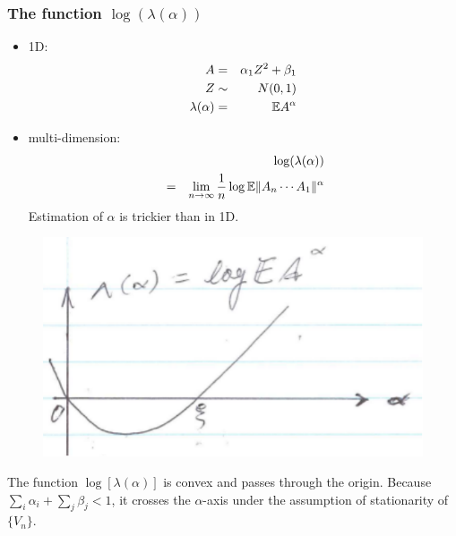 \documentclass{beamer}
\begin{document}
\begin{frame}
  \frametitle{The function $\log(\lambda(\alpha))$}
  \begin{minipage}{0.5\linewidth}
    \begin{small}
      \begin{itemize}
      \item 1D:
        \begin{eqnarray*}
          A &=& \alpha_1 Z^2 + \beta_1 \\
          Z &\sim& N(0,1) \\
          \lambda(\alpha) &=& \mathbb{E} A^\alpha          
        \end{eqnarray*}
      \item multi-dimension:
        \begin{eqnarray*}
          && \log(\lambda(\alpha)) \\
          &=&
          \lim_{n \to \infty} {1 \over n} \log \mathbb{E} \|A_n \cdots A_1\|^\alpha
        \end{eqnarray*}
        Estimation of $\alpha$ is trickier than in 1D.
      \end{itemize}
    \end{small}
  \end{minipage}\hfill
  \begin{minipage}{0.4\linewidth}
    \begin{figure}
      \centering
      \includegraphics[width=1.0\linewidth]{pic2.pdf}
    \end{figure}
    \begin{scriptsize}
      The function $\log[\lambda(\alpha)]$ is convex and passes through the origin.
      Because $\sum_i \alpha_i + \sum_j \beta_j < 1$, it crosses the $\alpha$-axis
      under the assumption of stationarity of $\{V_n\}$.
    \end{scriptsize}
  \end{minipage}
\end{frame}
\end{document}
